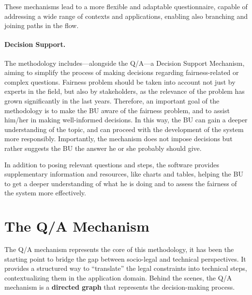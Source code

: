 \documentclass[12pt,a4paper,openright,twoside]{book}
\begin{document}
These mechanisms lead to a more flexible and adaptable questionnaire, capable of addressing a wide range of contexts and applications, enabling also branching and joining paths in the flow.



\paragraph{Decision Support.}
The methodology includes---alongside the \ac{Q/A}---a Decision Support Mechanism, aiming to simplify the process of making decisions regarding fairness-related or complex questions.
%
Fairness problem should be taken into account not just by experts in the field, but also by stakeholders, as the relevance of the problem has grown significantly in the last years.
%
Therefore, an important goal of the methodology is to make the \ac{BU} aware of the fairness problem, and to assist him/her in making well-informed decisions.
%
In this way, the \ac{BU} can gain a deeper understanding of the topic, and can proceed with the development of the system more responsibly.
%
Importantly, the mechanism does not impose decisions but rather suggests the \ac{BU} the answer he or she probably should give.

In addition to posing relevant questions and steps, the software provides supplementary information and resources, like charts and tables, helping the \ac{BU} to get a deeper understanding of what he is doing and to assess the fairness of the system more effectively.


\section{The \acs{Q/A} Mechanism}

The \acf{Q/A} mechanism represents the core of this methodology, it has been the starting point to bridge the gap between socio-legal and technical perspectives.
%
It provides a structured way to ``translate'' the legal constraints into technical steps, contextualizing them in the application domain.
%
Behind the scenes, the \ac{Q/A} mechanism is a \textbf{directed graph} that represents the decision-making process.
\end{document}
